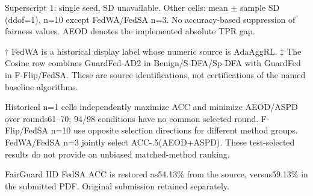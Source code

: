 \begin{minipage}{\linewidth}\footnotesize
Superscript $1$: single seed, SD unavailable. Other cells: mean $\pm$ sample SD (ddof=1), n=10 except FedWA/FedSA n=3. No accuracy-based suppression of fairness values. AEOD denotes the implemented absolute TPR gap.
\par $\dagger$ FedWA is a historical display label whose numeric source is AdaAggRL. $\ddagger$ The Cosine row combines GuardFed-AD2 in Benign/S-DFA/Sp-DFA with GuardFed in F-Flip/FedSA. These are source identifications, not certifications of the named baseline algorithms.
\par Historical n=1 cells independently maximize ACC and minimize AEOD/ASPD over rounds61--70; 94/98 conditions have no common selected round. F-Flip/FedSA n=10 use opposite selection directions for different method groups. FedWA/FedSA n=3 jointly select ACC-.5(AEOD+ASPD). These test-selected results do not provide an unbiased matched-method ranking.
\par FairGuard IID FedSA ACC is restored as54.13\% from the source, versus59.13\% in the submitted PDF. Original submission retained separately.
\end{minipage}
